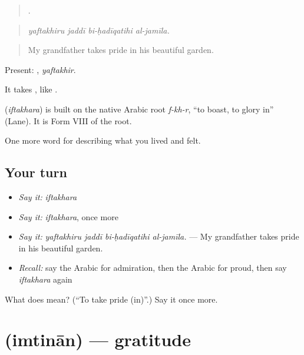 \begin{quote}
   .
\end{quote}

\begin{quote}
\emph{yaftakhiru jaddī bi-ḥadīqatihi al-jamīla.}
\end{quote}

\begin{quote}
My grandfather takes pride in his beautiful garden.
\end{quote}

Present: , \emph{yaftakhir}.

It takes , like .

\begin{cousinweb}
\textbf{} (\emph{iftakhara}) is built on the native Arabic root \emph{f-kh-r}, \textquotedblleft{}to boast, to glory in\textquotedblright{} (Lane). It is Form VIII of the root.
\end{cousinweb}

\begin{grammarlens}[title={What you've built}]
One more word for describing what you lived and felt.
\end{grammarlens}

\subsection*{Your turn}
\begin{itemize}
\raggedright
  \item \emph{Say it:} \emph{iftakhara}
  \item \emph{Say it:} \emph{iftakhara}, once more
  \item \emph{Say it:} \emph{yaftakhiru jaddī bi-ḥadīqatihi al-jamīla.} — My grandfather takes pride in his beautiful garden.
  \item \emph{Recall:} say the Arabic for admiration, then the Arabic for proud, then say \emph{iftakhara} again
\end{itemize}

\begin{tcolorbox}[breakable,colback=teal!4,colframe=teal!35!black,title={Before you move on}]
What does  mean? (\textquotedblleft{}To take pride (in)\textquotedblright{}.) Say it once more.
\end{tcolorbox}
\section[\texorpdfstring{\ar{امتنان} (imtinān)}{امتنان (imtinān)}]{ (imtinān) — gratitude}

